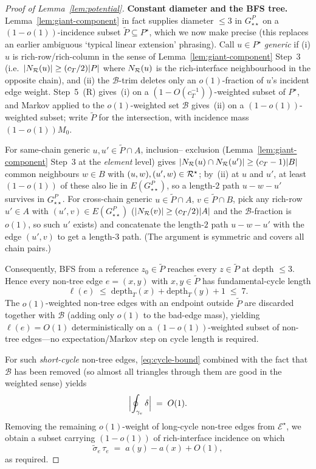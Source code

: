 \begin{proof}[Proof of Lemma~\ref{lem:potential}]
\textbf{Constant diameter and the BFS tree.}
Lemma~\ref{lem:giant-component} in fact supplies diameter $\le 3$ in
$G^P_{\star\star}$ on a
$(1-o(1))$-incidence subset $\widetilde P\subseteq P^\star$, which
we now make precise (this replaces an earlier ambiguous `typical
linear extension' phrasing).  Call $u\in P^\star$ \emph{generic} if
(i) $u$ is rich-row/rich-column in the sense of
Lemma~\ref{lem:giant-component} Step~3 (i.e.\ $|N_{\mathcal{R}}(u)|\ge
(c_T/2)|P|$ where $N_{\mathcal{R}}(u)$ is the rich-interface neighbourhood
in the opposite chain), and (ii) the $\mathcal{B}$-trim deletes only
an $o(1)$-fraction of $u$'s incident edge weight.  Step~5~(R)
gives~(i) on a $(1-O(c_T^{-1}))$-weighted subset of $P^\star$, and
Markov applied to the $o(1)$-weighted set $\mathcal{B}$ gives~(ii)
on a $(1-o(1))$-weighted subset; write $\widetilde P$ for the
intersection, with incidence mass $(1-o(1))M_0$.

For same-chain generic $u,u'\in\widetilde P\cap A$, inclusion--
exclusion (Lemma~\ref{lem:giant-component} Step~3 at the
\emph{element} level) gives $|N_{\mathcal{R}}(u)\cap N_{\mathcal{R}}(u')|\ge
(c_T-1)|B|$ common neighbours $w\in B$ with
$(u,w),(u',w)\in\mathcal{R}^\star$; by~(ii) at $u$ and $u'$, at least
$(1-o(1))$ of these also lie in $E(G^P_{\star\star})$, so a
length-$2$ path $u{-}w{-}u'$ survives in $G^P_{\star\star}$.  For
cross-chain generic $u\in\widetilde P\cap A$,
$v\in\widetilde P\cap B$, pick any rich-row $u'\in A$ with
$(u',v)\in E(G^P_{\star\star})$ ($|N_{\mathcal{R}}(v)|\ge(c_T/2)|A|$ and
the $\mathcal{B}$-fraction is $o(1)$, so such $u'$ exists) and
concatenate the length-$2$ path $u{-}w{-}u'$ with the edge
$(u',v)$ to get a length-$3$ path.  (The argument is symmetric and
covers all chain pairs.)

Consequently, BFS from a reference $z_0\in\widetilde P$ reaches
every $z\in\widetilde P$ at depth $\le 3$.  Hence every non-tree
edge $e=(x,y)$ with $x,y\in\widetilde P$ has fundamental-cycle
length
\[
  \ell(e)\;\le\;\mathrm{depth}_T(x)+\mathrm{depth}_T(y)+1\;\le\;7.
\]
The $o(1)$-weighted non-tree edges with an endpoint outside
$\widetilde P$ are discarded together with $\mathcal{B}$ (adding
only $o(1)$ to the bad-edge mass), yielding $\ell(e)=O(1)$
deterministically on a $(1-o(1))$-weighted subset of non-tree
edges---no expectation/Markov step on cycle length is required.

For such \emph{short-cycle} non-tree edges, \eqref{eq:cycle-bound}
combined with the fact that $\mathcal{B}$ has been removed (so almost
all triangles through them are good in the weighted sense) yields
\[
  \Bigl|\oint_{\gamma_e}\delta\Bigr| \;=\; O(1).
\]
Removing the remaining $o(1)$-weight of long-cycle non-tree edges
from $\mathcal{E}^\star$, we obtain a subset carrying $(1-o(1))$ of
rich-interface incidence on which
\[
  \widetilde\sigma_e\,\tau_e \;=\; a(y)-a(x) + O(1),
\]
as required.
\end{proof}

